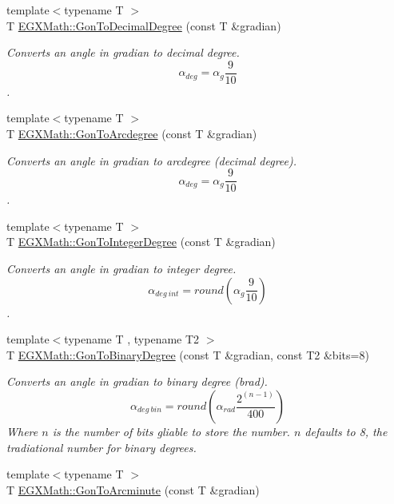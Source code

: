 \begin{DoxyCompactItemize}
{\footnotesize template$<$typename T $>$ }\\T \mbox{\hyperlink{group___e_g_x_math-_angle_conversions-_gon_ga737e654bac7b6aa9c18f73b1b83e0605}{E\+G\+X\+Math\+::\+Gon\+To\+Decimal\+Degree}} (const T \&gradian)
\begin{DoxyCompactList}\small\item\em Converts an angle in gradian to decimal degree. \[\alpha_{deg}=\alpha_{g}\frac{9}{10}\]. \end{DoxyCompactList}\item 
{\footnotesize template$<$typename T $>$ }\\T \mbox{\hyperlink{group___e_g_x_math-_angle_conversions-_gon_ga00757282768841abe48ac3c8452627cb}{E\+G\+X\+Math\+::\+Gon\+To\+Arcdegree}} (const T \&gradian)
\begin{DoxyCompactList}\small\item\em Converts an angle in gradian to arcdegree (decimal degree). \[\alpha_{deg}=\alpha_{g}\frac{9}{10}\]. \end{DoxyCompactList}\item 
{\footnotesize template$<$typename T $>$ }\\T \mbox{\hyperlink{group___e_g_x_math-_angle_conversions-_gon_gaabbfaeef5b1ae1b3e58c5b4b15c8bdaf}{E\+G\+X\+Math\+::\+Gon\+To\+Integer\+Degree}} (const T \&gradian)
\begin{DoxyCompactList}\small\item\em Converts an angle in gradian to integer degree. \[\alpha_{deg\ int}=round(\alpha_{g}\frac{9}{10})\]. \end{DoxyCompactList}\item 
{\footnotesize template$<$typename T , typename T2 $>$ }\\T \mbox{\hyperlink{group___e_g_x_math-_angle_conversions-_gon_ga4f3f154b9c553b22af2621ac3d196648}{E\+G\+X\+Math\+::\+Gon\+To\+Binary\+Degree}} (const T \&gradian, const T2 \&bits=8)
\begin{DoxyCompactList}\small\item\em Converts an angle in gradian to binary degree (brad). \[\alpha_{deg\ bin}=round(\alpha_{rad}\frac{2^{(n-1)}}{400})\] Where $n$ is the number of bits gliable to store the number. $n$ defaults to 8, the tradiational number for binary degrees. \end{DoxyCompactList}\item 
{\footnotesize template$<$typename T $>$ }\\T \mbox{\hyperlink{group___e_g_x_math-_angle_conversions-_gon_ga02679f6b0f3520ede1db642aadb51383}{E\+G\+X\+Math\+::\+Gon\+To\+Arcminute}} (const T \&gradian)

\end{DoxyCompactItemize}
